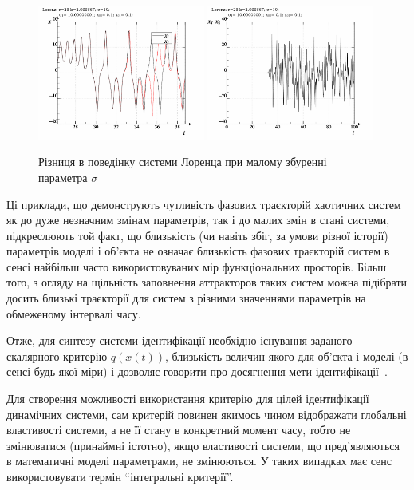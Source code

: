 \begin{figure}[htb!]
  \begin{center}
    \includegraphics[width=0.49\textwidth]{p/lor_diff-p_xx_sigma.png}
    \hfill
    \includegraphics[width=0.49\textwidth]{p/lor_diff-p_dx_sigma.png}
  \end{center}
  \caption{Різниця в поведінку системи Лоренца при малому збуренні параметра $ \sigma $}
  \label{atu:f:lor_diff_sigma}
\end{figure}

Ці приклади, що демонструють чутливість фазових траєкторій
хаотичних систем як до дуже незначним змінам параметрів,
так і до малих змін в стані системи, підкреслюють той факт, що
близькість (чи навіть збіг, за умови різної історії) параметрів
моделі і об'єкта не означає близькість фазових траєкторій
систем в сенсі найбільш часто використовуваних мір
функціональних просторів. Більш того, з огляду на щільність
заповнення аттракторов таких систем можна підібрати досить
близькі траєкторії для систем з різними значеннями параметрів
на обмеженому інтервалі часу.

Отже, для синтезу системи ідентифікації необхідно існування заданого скалярного
критерію $q(x(t))$, близькість величин якого для об'єкта і моделі (в сенсі
будь-якої міри) і дозволяє говорити про досягнення мети ідентифікації~\cite{crit_method_is}.


Для створення можливості використання критерію для цілей ідентифікації
динамічних системи, сам критерій повинен якимось чином відображати глобальні
властивості системи, а не її стану в конкретний момент часу, тобто не
змінюватися (принаймні істотно), якщо властивості системи, що пред'являються в
математичні моделі параметрами, не змінюються. У таких випадках має сенс
використовувати термін ``інтегральні критерії''.

